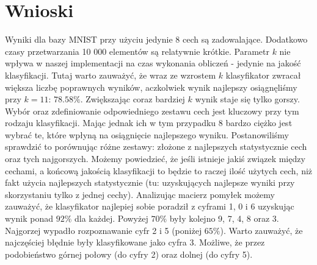 \documentclass{classrep}
\begin{document}
\section{Wnioski}

Wyniki dla bazy MNIST przy użyciu jedynie 8 cech są zadowalające. Dodatkowo czasy przetwarzania 10 000 elementów są relatywnie krótkie. Parametr $k$ nie wpływa w naszej implementacji na czas wykonania obliczeń - jedynie na jakość klasyfikacji. Tutaj warto zauważyć, że wraz ze wzrostem $k$ klasyfikator zwracał większa liczbę poprawnych wyników, aczkolwiek wynik najlepszy osiągnęliśmy przy $k=11$: $78.58\%$. Zwiększając coraz bardziej $k$ wynik staje się tylko gorszy. Wybór oraz zdefiniowanie odpowiedniego zestawu cech jest kluczowy przy tym rodzaju klasyfikacji. Mając jednak ich w tym przypadku 8 bardzo ciężko jest wybrać te, które wpłyną na osiągnięcie najlepszego wyniku. Postanowiliśmy sprawdzić to porównując różne zestawy: złożone z najlepszych statystycznie cech oraz tych najgorszych. Możemy powiedzieć, że jeśli istnieje jakiś związek między cechami, a końcową jakością klasyfikacji to będzie to raczej ilość użytych cech, niż fakt użycia najlepszych statystycznie (tu: uzyskujących najlepsze wyniki przy skorzystaniu tylko z jednej cechy). Analizując macierz pomyłek możemy zauważyć, że klasyfikator najlepiej sobie poradził z cyframi 1, 0 i 6 uzyskując wynik ponad $92\%$ dla każdej. Powyżej $70\%$ były kolejno 9, 7, 4, 8 oraz 3. Najgorzej wypadło rozpoznawanie cyfr 2 i 5 (poniżej $65\%$). Warto zauważyć, że najczęściej błędnie były klasyfikowane jako cyfra 3. Możliwe, że przez podobieństwo górnej połowy (do cyfry 2) oraz dolnej (do cyfry 5).
\end{document}
